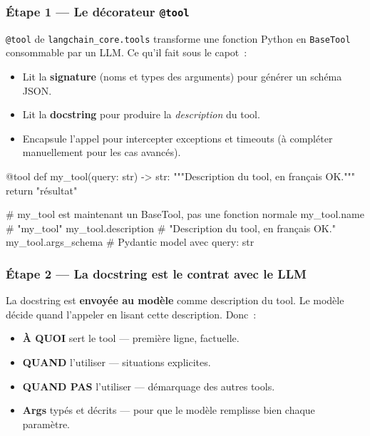 \documentclass[11pt,a4paper]{article}
\begin{document}
\subsubsection*{Étape 1 — Le décorateur \texttt{@tool}}

\texttt{@tool} de \texttt{langchain\_core.tools} transforme une fonction
Python en \texttt{BaseTool} consommable par un LLM. Ce qu'il fait sous
le capot~:

\begin{itemize}[leftmargin=*]
  \item Lit la \textbf{signature} (noms et types des arguments) pour
        générer un schéma JSON.
  \item Lit la \textbf{docstring} pour produire la \emph{description}
        du tool.
  \item Encapsule l'appel pour intercepter exceptions et timeouts (à
        compléter manuellement pour les cas avancés).
\end{itemize}

\begin{pythoncode}
@tool
def my_tool(query: str) -> str:
    """Description du tool, en français OK."""
    return "résultat"

# my_tool est maintenant un BaseTool, pas une fonction normale
my_tool.name           # "my_tool"
my_tool.description    # "Description du tool, en français OK."
my_tool.args_schema    # Pydantic model avec query: str
\end{pythoncode}

\subsubsection*{Étape 2 — La docstring est le contrat avec le LLM}

La docstring est \textbf{envoyée au modèle} comme description du tool.
Le modèle décide quand l'appeler en lisant cette description. Donc~:

\begin{itemize}[leftmargin=*]
  \item \textbf{À QUOI} sert le tool — première ligne, factuelle.
  \item \textbf{QUAND} l'utiliser — situations explicites.
  \item \textbf{QUAND PAS} l'utiliser — démarquage des autres tools.
  \item \textbf{Args} typés et décrits — pour que le modèle remplisse
        bien chaque paramètre.
\end{itemize}
\end{document}
